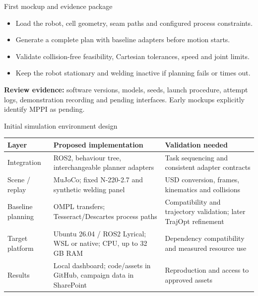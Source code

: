 \documentclass[aspectratio=169,10pt]{beamer}
\begin{document}
\begin{frame}{First mockup and evidence package}
\begin{itemize}\items
\item Load the robot, cell geometry, seam paths and configured process constraints.
\item Generate a complete plan with baseline adapters before motion starts.
\item Validate collision-free feasibility, Cartesian tolerances, speed and joint limits.
\item Keep the robot stationary and welding inactive if planning fails or times out.
\end{itemize}
\small
\textbf{Review evidence:} software versions, models, seeds, launch procedure, attempt logs, demonstration recording and pending interfaces. Early mockups explicitly identify MPPI as pending.
\end{frame}

\begin{frame}{Initial simulation environment design}
\small\renewcommand{\arraystretch}{1.25}
\begin{tabularx}{\textwidth}{@{}p{}XX@{}}
\toprule
Layer & Proposed implementation & Validation needed\\\midrule
Integration & ROS2, behaviour tree, interchangeable planner adapters & Task sequencing and consistent adapter contracts\\
Scene / replay & MuJoCo; fixed N-220-2.7 and synthetic welding panel & USD conversion, frames, kinematics and collisions\\
Baseline planning & OMPL transfers; Tesseract/Descartes process paths & Compatibility and trajectory validation; later TrajOpt refinement\\
Target platform & Ubuntu 26.04 / ROS2 Lyrical; WSL or native; CPU, up to 32 GB RAM & Dependency compatibility and measured resource use\\
Results & Local dashboard; code/assets in GitHub, campaign data in SharePoint & Reproduction and access to approved assets\\\bottomrule
\end{tabularx}
\end{frame}
\end{document}
